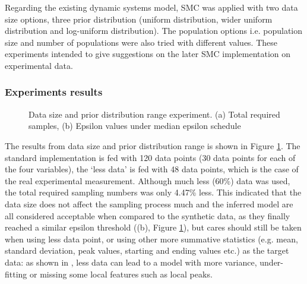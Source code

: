 Regarding the existing dynamic systems model, SMC was applied with two data size options, three prior distribution (uniform distribution, wider uniform distribution and log-uniform distribution). The population options i.e. population size and number of populations were also tried with different values. These experiments intended to give suggestions on the later SMC implementation on experimental data.

\subsubsection{Experiments results}

\begin{figure}[H]
    \begin{center}
    \end{center}

    \caption[Data size and prior distribution range experiment]%
    {Data size and prior distribution range experiment. (a) Total required samples, (b) Epsilon values under median epsilon schedule}
    \label{fig:size}

\end{figure}

The results from data size and prior distribution range is shown in Figure \ref{fig:size}. The standard implementation is fed with 120 data points (30 data points for each of the four variables), the `less data' is fed with 48 data points, which is the case of the real experimental measurement. Although much less (60\%) data was used, the total required sampling numbers was only 4.47\% less. This indicated that the data size does not affect the sampling process much and the inferred model are all considered acceptable when compared to the synthetic data, as they finally reached a similar epsilon threshold ((b), Figure \ref{fig:size}), but cares should still be taken when using less data point, or using other more summative statistics (e.g. mean, standard deviation, peak values, starting and ending values etc.) as the target data: as shown in \cite{ref:disease}, less data can lead to a model with more variance, under-fitting or missing some local features such as local peaks.

